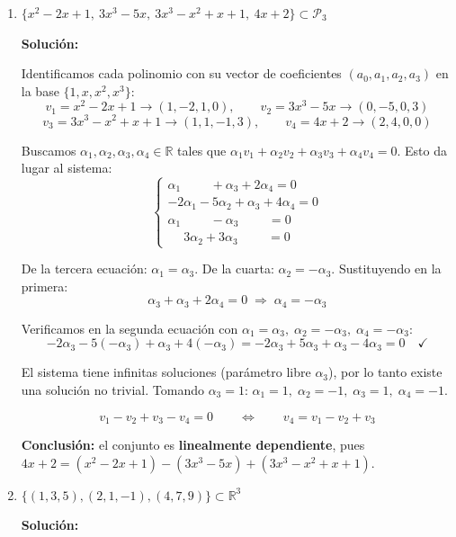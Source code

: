 \documentclass[12pt]{article}
\newcommand{\solucion}{%
    \vspace{0.8em}%
    \textbf{Solución:}%
    \vspace{0.8em}%
}
\begin{document}
\begin{enumerate}[label=\alph*.-]
    \item $\{x^2 - 2x + 1,\ 3x^3 - 5x,\ 3x^3 - x^2 + x + 1,\ 4x + 2\} \subset \mathcal{P}_3$

    \solucion

    Identificamos cada polinomio con su vector de coeficientes $(a_0,a_1,a_2,a_3)$ en la base $\{1,x,x^2,x^3\}$:
    \[
    v_1 = x^2-2x+1 \to (1,-2,1,0), \qquad v_2 = 3x^3-5x \to (0,-5,0,3)
    \]
    \[
    v_3 = 3x^3-x^2+x+1 \to (1,1,-1,3), \qquad v_4 = 4x+2 \to (2,4,0,0)
    \]

    Buscamos $\alpha_1,\alpha_2,\alpha_3,\alpha_4 \in \mathbb{R}$ tales que $\alpha_1 v_1+\alpha_2 v_2+\alpha_3 v_3+\alpha_4 v_4 = 0$. Esto da lugar al sistema:
    \[
    \begin{cases}
    \alpha_1 \phantom{-5\alpha_2} + \alpha_3 + 2\alpha_4 = 0 \\
    -2\alpha_1 -5\alpha_2 + \alpha_3 + 4\alpha_4 = 0 \\
    \alpha_1 \phantom{-5\alpha_2} - \alpha_3 \phantom{+4\alpha_4} = 0 \\
    \phantom{\alpha_1}\ 3\alpha_2 + 3\alpha_3 \phantom{+4\alpha_4} = 0
    \end{cases}
    \]

    De la tercera ecuación: $\alpha_1=\alpha_3$. De la cuarta: $\alpha_2=-\alpha_3$. Sustituyendo en la primera:
    \[
    \alpha_3+\alpha_3+2\alpha_4=0 \;\Longrightarrow\; \alpha_4=-\alpha_3
    \]

    Verificamos en la segunda ecuación con $\alpha_1=\alpha_3,\;\alpha_2=-\alpha_3,\;\alpha_4=-\alpha_3$:
    \[
    -2\alpha_3-5(-\alpha_3)+\alpha_3+4(-\alpha_3) = -2\alpha_3+5\alpha_3+\alpha_3-4\alpha_3 = 0 \quad \checkmark
    \]

    El sistema tiene infinitas soluciones (parámetro libre $\alpha_3$), por lo tanto existe una solución no trivial. Tomando $\alpha_3=1$: $\alpha_1=1,\;\alpha_2=-1,\;\alpha_3=1,\;\alpha_4=-1$.

    \[
    v_1 - v_2 + v_3 - v_4 = 0 \qquad \Longleftrightarrow \qquad v_4 = v_1 - v_2 + v_3
    \]

    \textbf{Conclusión:} el conjunto es \textbf{linealmente dependiente}, pues $4x+2 = (x^2-2x+1) - (3x^3-5x) + (3x^3-x^2+x+1)$.

    \item $\{(1,3,5),(2,1,-1),(4,7,9)\} \subset \mathbb{R}^3$

    \solucion


\end{enumerate}
\end{document}
